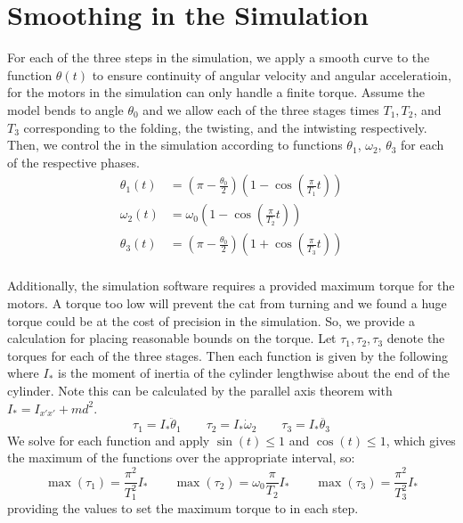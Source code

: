 \documentclass[12]{amsart}
\theoremstyle{definition}
\begin{document}
\section{Smoothing in the Simulation}
For each of the three steps in the simulation, we apply a smooth curve to the function $\theta(t)$ to ensure continuity of angular velocity and angular acceleratioin, for the motors in the simulation can only handle a finite torque. Assume the model bends to angle $\theta_0$ and we allow each of the three stages times $T_1, T_2$, and $T_3$ corresponding to the folding, the twisting, and the intwisting respectively. Then, we control the  in the simulation according to functions $\theta_1$, $\omega_2$, $\theta_3$ for each of the respective phases.
\begin{align*}
  \theta_1(t) &= \left(\pi- \frac{\theta_0}{2} \right)\left(1-\cos\left( \frac{\pi}{T_1} t \right)\right)\\
  \omega_2(t) &= \omega_0\left(1-\cos\left( \frac{\pi}{T_2} t \right) \right)\\
  \theta_3(t) &= \left(\pi- \frac{\theta_0}{2} \right)\left(1+\cos\left( \frac{\pi}{T_3} t \right)\right)\\
\end{align*}

Additionally, the simulation software requires a provided maximum torque for the motors. A torque too low will prevent the cat from turning and we found a huge torque could be at the cost of precision in the simulation. So, we provide a calculation for placing reasonable bounds on the torque. Let $\tau_1, \tau_2, \tau_3$ denote the torques for each of the three stages. Then each function is given by the following where $I_*$ is the moment of inertia of the cylinder lengthwise about the end of the cylinder. Note this can be calculated by the parallel axis theorem with $I_* = I_{x'x'} + md^2$.
\begin{equation*}
  \tau_1 = I_* \ddot\theta_1 \quad\quad \tau_2 = I_* \dot\omega_2 \quad\quad \tau_3 = I_* \ddot{\theta_3}
\end{equation*}
We solve for each function and apply $\sin(t) \leq 1$ and $\cos(t) \leq 1$, which gives the maximum of the functions over the appropriate interval, so:
\begin{equation*}
  \max(\tau_1) = \frac{\pi^2}{T_1^2} I_* \quad\quad \max(\tau_2) = \omega_0\frac{\pi}{T_2} I_* \quad\quad \max(\tau_3) = \frac{\pi^2}{T_3^2} I_*
\end{equation*}
providing the values to set the maximum torque to in each step.
\end{document}
